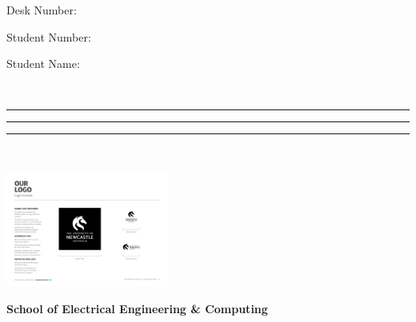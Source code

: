 \documentclass[a4paper,12pt]{article}
\begin{document}


\begin{doublespace}

  \vspace*{-10mm}


  \begin{minipage}[t]{0.23\linewidth}
    
    \footnotesize

    Desk Number:

    \vspace{0.5mm}

    Student Number:

    \vspace{0.5mm}

    Student Name: 

    {\ }
  \end{minipage}  \begin{minipage}[t]{0.4\linewidth}
    
    \footnotesize

    \rule{2cm}{0.2mm}

    \vspace{0.5mm}

    \rule{5cm}{0.2mm}

    \vspace{0.5mm}

    \rule{5cm}{0.2mm}

    {\ }
  \end{minipage}\hfill
  \begin{minipage}[b]{3.78cm}
    \hspace*{10mm}\includegraphics[height=3.78cm]{uon_logo_black_square.pdf}
    \vspace*{-3.78cm}
  \end{minipage}


  \vspace{20mm}



  \begin{center}
    \textbf{\large School of Electrical Engineering \& Computing}

    \vspace{1mm}


\end{center}
\end{doublespace}
\end{document}
